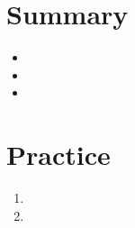 \documentclass[main.tex]{subfiles}
\begin{document}
\section{Summary}

\begin{itemize}
	\item 
	\item 
	\item 
\end{itemize}

\section{Practice}

\begin{enumerate}
	\item 
	\item 
\end{enumerate}
\end{document}
